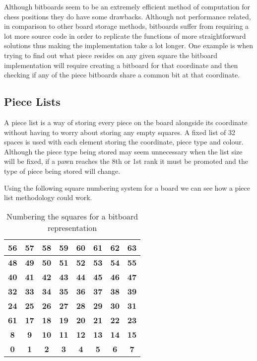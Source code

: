 \documentclass[11pt]{report}
\begin{document}
Although bitboards seem to be an extremely efficient method of computation for chess positions they do have some drawbacks. Although not performance related, in comparison to other board storage methods, bitboards suffer from requiring a lot more source code in order to replicate the functions of more straightforward solutions thus making the implementation take a lot longer. One example is when trying to find out what piece resides on any given square the bitboard implementation will require creating a bitboard for that coordinate and then checking if any of the piece bitboards share a common bit at that coordinate. \newline

\subsection{Piece Lists}

A piece list is a way of storing every piece on the board alongside its coordinate without having to worry about storing any empty squares. A fixed list of 32 spaces is used with each element storing the coordinate, piece type and colour. Although the piece type being stored may seem unnecessary when the list size will be fixed, if a pawn reaches the 8th or 1st rank it must be promoted and the type of piece being stored will change. \newline

Using the following square numbering system for a board we can see how a piece list methodology could work.

\begin{table}[H]
\centering
\begin{tabular}{|c|c|c|c|c|c|c|c|}
\hline
\textbf{56} & \textbf{57} & \textbf{58} & \textbf{59} & \textbf{60} & \textbf{61} & \textbf{62} & \textbf{63} \\ \hline
\textbf{48} & \textbf{49} & \textbf{50} & \textbf{51} & \textbf{52} & \textbf{53} & \textbf{54} & \textbf{55} \\ \hline
\textbf{40} & \textbf{41} & \textbf{42} & \textbf{43} & \textbf{44} & \textbf{45} & \textbf{46} & \textbf{47} \\ \hline
\textbf{32} & \textbf{33} & \textbf{34} & \textbf{35} & \textbf{36} & \textbf{37} & \textbf{38} & \textbf{39} \\ \hline
\textbf{24} & \textbf{25} & \textbf{26} & \textbf{27} & \textbf{28} & \textbf{29} & \textbf{30} & \textbf{31} \\ \hline
\textbf{61} & \textbf{17} & \textbf{18} & \textbf{19} & \textbf{20} & \textbf{21} & \textbf{22} & \textbf{23} \\ \hline
\textbf{8}  & \textbf{9}  & \textbf{10} & \textbf{11} & \textbf{12} & \textbf{13} & \textbf{14} & \textbf{15} \\ \hline
\textbf{0}  & \textbf{1}  & \textbf{2}  & \textbf{3}  & \textbf{4}  & \textbf{5}  & \textbf{6}  & \textbf{7}  \\ \hline
\end{tabular}
\caption{Numbering the squares for a bitboard representation}
\end{table}
\end{document}
